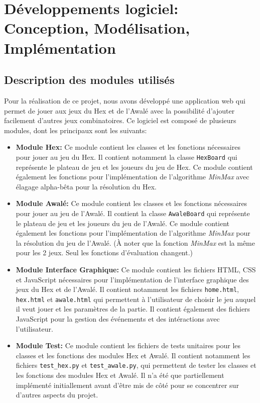 \section{Développements logiciel: Conception, Modélisation, Implémentation} 
\subsection{Description des modules utilisés}
Pour la réalisation de ce projet, nous avons développé une application web qui permet de jouer
aux jeux du Hex et de l'Awalé avec la possibilité d'ajouter facilement d'autres jeux combinatoires. Ce logiciel est
composé de plusieurs modules, dont les principaux sont les suivants:

\begin{itemize}
    \item \textbf{Module Hex:} Ce module contient les classes et les fonctions nécessaires
    pour jouer au jeu du Hex. Il contient notamment la classe \texttt{HexBoard} qui 
    représente le plateau de jeu et les joueurs du jeu de Hex. Ce module contient également 
    les fonctions pour l'implémentation de l'algorithme \emph{MinMax} avec élagage alpha-bêta pour 
    la résolution du Hex.
    
    \item \textbf{Module Awalé:} Ce module contient les classes et les fonctions nécessaires
    pour jouer au jeu de l'Awalé. Il contient la classe \texttt{AwaleBoard} qui représente le
    plateau de jeu et les joueurs du jeu de l'Awalé. Ce module contient également les fonctions
    pour l'implémentation de l'algorithme \emph{MinMax} pour la résolution du jeu de l'Awalé. (À noter que la fonction \emph{MinMax}
    est la même pour les 2 jeux. Seul les fonctions d'évaluation changent.)
    
    \item \textbf{Module Interface Graphique:} Ce module contient les fichiers HTML, CSS et
    JavaScript nécessaires pour l'implémentation de l'interface graphique des jeux du Hex et
    de l'Awalé. Il contient notamment les fichiers \texttt{home.html}, \texttt{hex.html} et
    \texttt{awale.html} qui permettent à l'utilisateur de choisir le jeu auquel il veut jouer
    et les paramètres de la partie. Il contient également des fichiers JavaScript pour la
    gestion des événements et des intéractions avec l'utilisateur.
    
    \item \textbf{Module Test:} Ce module contient les fichiers de tests unitaires pour les
    classes et les fonctions des modules Hex et Awalé. Il contient notamment les fichiers
    \texttt{test\_hex.py} et \texttt{test\_awale.py}, qui permettent de tester les classes
    et les fonctions des modules Hex et Awalé. Il n'a été que partiellement implémenté 
    initiallement avant d'être mis de côté pour se concentrer sur d'autres aspects du projet.
\end{itemize}


